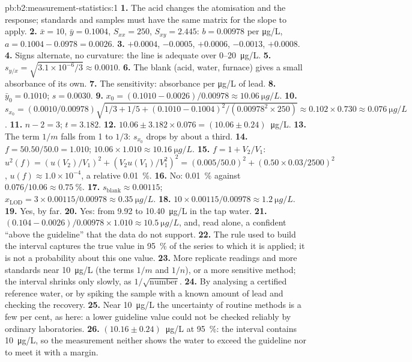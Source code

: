 \begin{solution}{pb:b2:measurement-statistics:1}
\textbf{1.} The acid changes the atomisation and the response; standards and samples must have the same
matrix for the slope to apply.
\textbf{2.} $\bar x = 10$, $\bar y = 0.1004$, $S_{xx} = 250$, $S_{xy} = 2.445$: $b = 0.00978$ per
\unit{\micro g/L}, $a = 0.1004 - 0.0978 = 0.0026$.
\textbf{3.} $+0.0004$, $-0.0005$, $+0.0006$, $-0.0013$, $+0.0008$.
\textbf{4.} Signs alternate, no curvature: the line is adequate over 0--\qty{20}{\micro g/L}.
\textbf{5.} $s_{y/x} = \sqrt{3.1 \times 10^{-6}/3} \approx 0.0010$.
\textbf{6.} The blank (acid, water, furnace) gives a small absorbance of its own.
\textbf{7.} The sensitivity: absorbance per \unit{\micro g/L} of lead.
\textbf{8.} $\bar y_0 = 0.1010$; $s = 0.0030$.
\textbf{9.} $x_0 = (0.1010 - 0.0026)/0.00978 \approx \qty{10.06}{\micro g/L}$.
\textbf{10.} $s_{x_0} = (0.0010/0.00978)\sqrt{1/3 + 1/5 + (0.1010 - 0.1004)^2/(0.00978^2 \times 250)}
\approx 0.102 \times 0.730 \approx \qty{0.076}{\micro g/L}$.
\textbf{11.} $n - 2 = 3$; $t = 3.182$.
\textbf{12.} $10.06 \pm 3.182 \times 0.076 = (10.06 \pm 0.24)$~\unit{\micro g/L}.
\textbf{13.} The term $1/m$ falls from 1 to $1/3$: $s_{x_0}$ drops by about a third.
\textbf{14.} $f = 50.50/50.0 = 1.010$; $10.06 \times 1.010 \approx \qty{10.16}{\micro g/L}$.
\textbf{15.} $f = 1 + V_2/V_1$: $u^2(f) = (u(V_2)/V_1)^2 + (V_2u(V_1)/V_1^2)^2 = (0.005/50.0)^2 +
(0.50 \times 0.03/2500)^2$, $u(f) \approx 1.0 \times 10^{-4}$, a relative 0.01~\%.
\textbf{16.} No: 0.01~\% against $0.076/10.06 \approx 0.75~\%$.
\textbf{17.} $s_{\mathrm{blank}} \approx 0.00115$; $x_{\mathrm{LOD}} = 3 \times 0.00115/0.00978 \approx
\qty{0.35}{\micro g/L}$.
\textbf{18.} $10 \times 0.00115/0.00978 \approx \qty{1.2}{\micro g/L}$.
\textbf{19.} Yes, by far.
\textbf{20.} Yes: from 9.92 to \qty{10.40}{\micro g/L} in the tap water.
\textbf{21.} $(0.104 - 0.0026)/0.00978 \times 1.010 \approx \qty{10.5}{\micro g/L}$, and, read alone,
a confident ``above the guideline'' that the data do not support.
\textbf{22.} The rule used to build the interval captures the true value in 95~\% of the series to
which it is applied; it is not a probability about this one value.
\textbf{23.} More replicate readings and more standards near \qty{10}{\micro g/L} (the terms $1/m$ and
$1/n$), or a more sensitive method; the interval shrinks only slowly, as $1/\sqrt{\text{number}}$.
\textbf{24.} By analysing a certified reference water, or by spiking the sample with a known amount of
lead and checking the recovery.
\textbf{25.} Near \qty{10}{\micro g/L} the uncertainty of routine methods is a few per cent, as here: a
lower guideline value could not be checked reliably by ordinary laboratories.
\textbf{26.} $\boldsymbol{(10.16 \pm 0.24)}$~\unit{\micro g/L} at 95~\%: the interval contains
\qty{10}{\micro g/L}, so the measurement neither shows the water to exceed the guideline nor to meet it
with a margin.
\end{solution}
